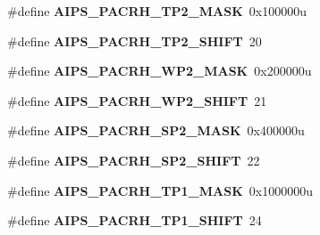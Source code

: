 \begin{DoxyCompactItemize}
\item 
\hypertarget{group___a_i_p_s___register___masks_ga5db2a0cc647700e09917f238f362f557}{}\#define {\bfseries A\+I\+P\+S\+\_\+\+P\+A\+C\+R\+H\+\_\+\+T\+P2\+\_\+\+M\+A\+S\+K}~0x100000u\label{group___a_i_p_s___register___masks_ga5db2a0cc647700e09917f238f362f557}

\item 
\hypertarget{group___a_i_p_s___register___masks_ga192e269418928d5af81015c80880ea8a}{}\#define {\bfseries A\+I\+P\+S\+\_\+\+P\+A\+C\+R\+H\+\_\+\+T\+P2\+\_\+\+S\+H\+I\+F\+T}~20\label{group___a_i_p_s___register___masks_ga192e269418928d5af81015c80880ea8a}

\item 
\hypertarget{group___a_i_p_s___register___masks_ga93d1ce3ca810abb1372e26a0a773f111}{}\#define {\bfseries A\+I\+P\+S\+\_\+\+P\+A\+C\+R\+H\+\_\+\+W\+P2\+\_\+\+M\+A\+S\+K}~0x200000u\label{group___a_i_p_s___register___masks_ga93d1ce3ca810abb1372e26a0a773f111}

\item 
\hypertarget{group___a_i_p_s___register___masks_ga6e39769cd6d49e3fbd0363bcdabfcf8a}{}\#define {\bfseries A\+I\+P\+S\+\_\+\+P\+A\+C\+R\+H\+\_\+\+W\+P2\+\_\+\+S\+H\+I\+F\+T}~21\label{group___a_i_p_s___register___masks_ga6e39769cd6d49e3fbd0363bcdabfcf8a}

\item 
\hypertarget{group___a_i_p_s___register___masks_ga6ca1bcae348acd71536e31efc8373a5c}{}\#define {\bfseries A\+I\+P\+S\+\_\+\+P\+A\+C\+R\+H\+\_\+\+S\+P2\+\_\+\+M\+A\+S\+K}~0x400000u\label{group___a_i_p_s___register___masks_ga6ca1bcae348acd71536e31efc8373a5c}

\item 
\hypertarget{group___a_i_p_s___register___masks_gae4e8423c6cbf58ccab66d70b7202025b}{}\#define {\bfseries A\+I\+P\+S\+\_\+\+P\+A\+C\+R\+H\+\_\+\+S\+P2\+\_\+\+S\+H\+I\+F\+T}~22\label{group___a_i_p_s___register___masks_gae4e8423c6cbf58ccab66d70b7202025b}

\item 
\hypertarget{group___a_i_p_s___register___masks_ga7e2f01951998b670ee0b9e8fd3a1826f}{}\#define {\bfseries A\+I\+P\+S\+\_\+\+P\+A\+C\+R\+H\+\_\+\+T\+P1\+\_\+\+M\+A\+S\+K}~0x1000000u\label{group___a_i_p_s___register___masks_ga7e2f01951998b670ee0b9e8fd3a1826f}

\item 
\hypertarget{group___a_i_p_s___register___masks_ga352e2bf0f4332e0ac72ec0281c12e105}{}\#define {\bfseries A\+I\+P\+S\+\_\+\+P\+A\+C\+R\+H\+\_\+\+T\+P1\+\_\+\+S\+H\+I\+F\+T}~24\label{group___a_i_p_s___register___masks_ga352e2bf0f4332e0ac72ec0281c12e105}


\end{DoxyCompactItemize}
